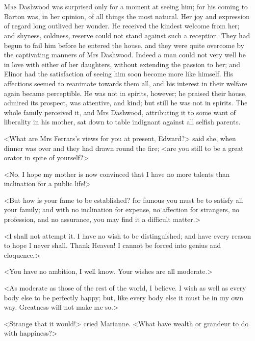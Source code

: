 \chapter[Chapter \thechapter]{}
\lettrine[lraise=0.3]{M}{rs} Dashwood was surprised only for a moment at seeing him; for his coming to Barton was, in her opinion, of all things the most natural. Her joy and expression of regard long outlived her wonder. He received the kindest welcome from her; and shyness, coldness, reserve could not stand against such a reception. They had begun to fail him before he entered the house, and they were quite overcome by the captivating manners of Mrs Dashwood. Indeed a man could not very well be in love with either of her daughters, without extending the passion to her; and Elinor had the satisfaction of seeing him soon become more like himself. His affections seemed to reanimate towards them all, and his interest in their welfare again became perceptible. He was not in spirits, however; he praised their house, admired its prospect, was attentive, and kind; but still he was not in spirits. The whole family perceived it, and Mrs Dashwood, attributing it to some want of liberality in his mother, sat down to table indignant against all selfish parents.

<What are Mrs Ferrars's views for you at present, Edward?> said she, when dinner was over and they had drawn round the fire; <are you still to be a great orator in spite of yourself?>

<No. I hope my mother is now convinced that I have no more talents than inclination for a public life!>

<But how is your fame to be established? for famous you must be to satisfy all your family; and with no inclination for expense, no affection for strangers, no profession, and no assurance, you may find it a difficult matter.>

<I shall not attempt it. I have no wish to be distinguished; and have every reason to hope I never shall. Thank Heaven! I cannot be forced into genius and eloquence.>

<You have no ambition, I well know. Your wishes are all moderate.>

<As moderate as those of the rest of the world, I believe. I wish as well as every body else to be perfectly happy; but, like every body else it must be in my own way. Greatness will not make me so.>

<Strange that it would!> cried Marianne. <What have wealth or grandeur to do with happiness?>

